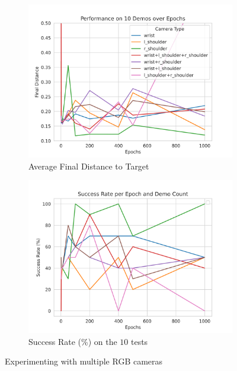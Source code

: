 \begin{figure}[htpb] %
  \centering
  \begin{subfigure}{0.45\linewidth}
    \centering
    \includegraphics[width=\linewidth]{assets/cam-comb/reach-no-obs/rno_random-cams.png}
    \caption{Average Final Distance to Target}\label{subfig:rno-random-cams-dist}
  \end{subfigure}
  \hfill
  \begin{subfigure}{0.45\linewidth}
    \centering
    \includegraphics[width=\linewidth]{assets/cam-comb/reach-no-obs/rno_random-cam_success.png}
    \caption{Success Rate (\%) on the $10$ tests}\label{subfig:rno-random-cams-success}
  \end{subfigure}
  \caption{Experimenting with multiple RGB cameras}\label{fig:rno-random-cams}
\end{figure}

